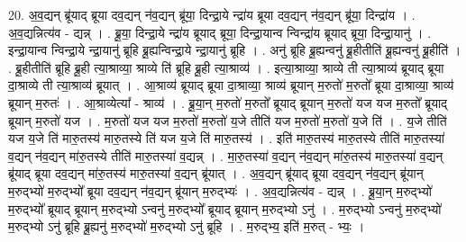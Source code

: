 \documentclass[17pt]{extarticle}
\begin{document}
20. अ॒व॒द्यन् ब्रू॑याद् ब्रूया दव॒द्यन् न॑व॒द्यन् ब्रू॑या॒ दिन्द्रा॒ये न्द्रा॑य ब्रूया दव॒द्यन् न॑व॒द्यन् ब्रू॑या॒ दिन्द्रा॑य । . अ॒व॒द्यन्नित्य॑व - द्यन्न् । . ब्रू॒या॒ दिन्द्रा॒ये न्द्रा॑य ब्रूयाद् ब्रूया॒ दिन्द्रा॒यान्व न्विन्द्रा॑य ब्रूयाद् ब्रूया॒ दिन्द्रा॒यानु॑ । . इन्द्रा॒यान्व न्विन्द्रा॒ये न्द्रा॒यानु॑ ब्रूहि ब्रू॒ह्यन्विन्द्रा॒ये न्द्रा॒यानु॑ ब्रूहि । . अनु॑ ब्रूहि ब्रू॒ह्यन्वनु॑ ब्रू॒हीतीति॑ ब्रू॒ह्यन्वनु॑ ब्रू॒हीति॑ । . ब्रू॒हीतीति॑ ब्रूहि ब्रू॒ही त्या॒श्राव्या॒ श्राव्ये ति॑ ब्रूहि ब्रू॒ही त्या॒श्राव्य॑ । . इत्या॒श्राव्या॒ श्राव्ये ती त्या॒श्राव्य॑ ब्रूयाद् ब्रूया दा॒श्राव्ये ती त्या॒श्राव्य॑ ब्रूयात् । . आ॒श्राव्य॑ ब्रूयाद् ब्रूया दा॒श्राव्या॒ श्राव्य॑ ब्रूयान् म॒रुतो॑ म॒रुतो᳚ ब्रूया दा॒श्राव्या॒ श्राव्य॑ ब्रूयान् म॒रुतः॑ । . आ॒श्राव्येत्या᳚ - श्राव्य॑ । . ब्रू॒या॒न् म॒रुतो॑ म॒रुतो᳚ ब्रूयाद् ब्रूयान् म॒रुतो॑ यज यज म॒रुतो᳚ ब्रूयाद् ब्रूयान् म॒रुतो॑ यज । . म॒रुतो॑ यज यज म॒रुतो॑ म॒रुतो॑ य॒जे तीति॑ यज म॒रुतो॑ म॒रुतो॑ य॒जे ति॑ । . य॒जे तीति॑ यज य॒जे ति॑ मारु॒तस्य॑ मारु॒तस्ये ति॑ यज य॒जे ति॑ मारु॒तस्य॑ । . इति॑ मारु॒तस्य॑ मारु॒तस्ये तीति॑ मारु॒तस्या॑ व॒द्यन् न॑व॒द्यन् मा॑रु॒तस्ये तीति॑ मारु॒तस्या॑ व॒द्यन्न् । . मा॒रु॒तस्या॑ व॒द्यन् न॑व॒द्यन् मा॑रु॒तस्य॑ मारु॒तस्या॑ व॒द्यन् ब्रू॑याद् ब्रूया दव॒द्यन् मा॑रु॒तस्य॑ मारु॒तस्या॑ व॒द्यन् ब्रू॑यात् । . अ॒व॒द्यन् ब्रू॑याद् ब्रूया दव॒द्यन् न॑व॒द्यन् ब्रू॑यान् म॒रुद्भ्यो॑ म॒रुद्भ्यो᳚ ब्रूया दव॒द्यन् न॑व॒द्यन् ब्रू॑यान् म॒रुद्भ्यः॑ । . अ॒व॒द्यन्नित्य॑व - द्यन्न् । . ब्रू॒या॒न् म॒रुद्भ्यो॑ म॒रुद्भ्यो᳚ ब्रूयाद् ब्रूयान् म॒रुद्भ्यो ऽन्वनु॑ म॒रुद्भ्यो᳚ ब्रूयाद् ब्रूयान् म॒रुद्भ्यो ऽनु॑ । . म॒रुद्भ्यो ऽन्वनु॑ म॒रुद्भ्यो॑ म॒रुद्भ्यो ऽनु॑ ब्रूहि ब्रू॒ह्यनु॑ म॒रुद्भ्यो॑ म॒रुद्भ्यो ऽनु॑ ब्रूहि । . म॒रुद्भ्य॒ इति॑ म॒रुत् - भ्यः॒ । \newline
\end{document}
